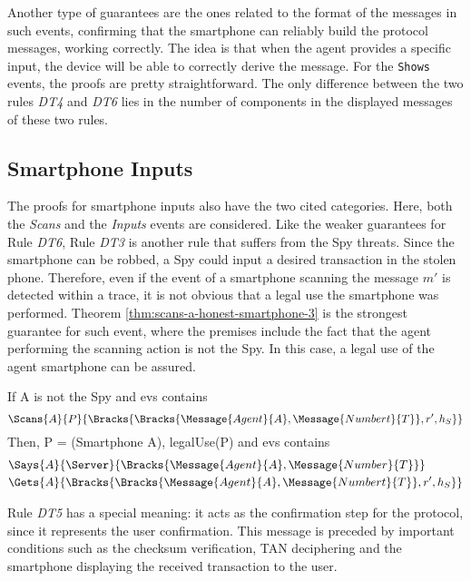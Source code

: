 Another type of guarantees are the ones related to the format of the messages in such events, confirming that the smartphone can reliably build the protocol messages, working correctly. The idea is that when the agent provides a specific input, the device will be able to correctly derive the message. For the \texttt{Shows} events, the proofs are pretty straightforward. The only difference between the two rules \textit{DT4} and \textit{DT6} lies in the number of components in the displayed messages of these two rules.


\subsection{Smartphone Inputs}
The proofs for smartphone inputs also have the two cited categories. Here, both the \textit{Scans} and the \textit{Inputs} events are considered. Like the weaker guarantees for Rule \textit{DT6}, Rule \textit{DT3} is another rule that suffers from the Spy threats. Since the smartphone can be robbed, a Spy could input a desired transaction in the stolen phone. Therefore, even if the event of a smartphone scanning the message \(m'\) is detected within a trace, it is not obvious that a legal use the smartphone was performed. Theorem \ref{thm:scans-a-honest-smartphone-3} is the strongest guarantee for such event, where the premises include the fact that the agent performing the scanning action is not the Spy. In this case, a legal use of the agent smartphone can be assured.

\begin{theorem}
\label{thm:scans-a-honest-smartphone-3}
  If A is not the Spy and evs contains
  \[\Scans{A}{P}{\Bracks{\Bracks{\Message{Agent}{A}, \Message{Numbert}{T}}, r', h_S}}\]
  Then, P = (Smartphone A), legalUse(P) and evs contains
  \begin{align*}
    & \Says{A}{\Server}{\Bracks{\Message{Agent}{A}, \Message{Number}{T}}} \\
    & \Gets{A}{\Bracks{\Bracks{\Message{Agent}{A}, \Message{Numbert}{T}}, r', h_S}}
  \end{align*}
  
\end{theorem}

Rule \textit{DT5} has a special meaning: it acts as the confirmation step for the protocol, since it represents the user confirmation. This message is preceded by important conditions such as the checksum verification, TAN deciphering and the smartphone displaying the received transaction to the user.

